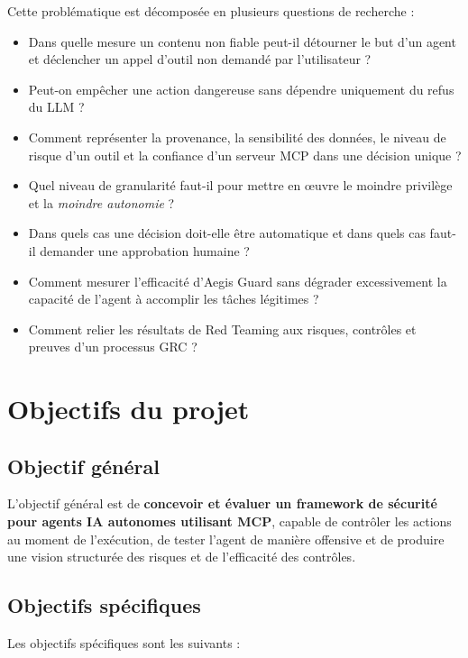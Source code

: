 Cette problématique est décomposée en plusieurs questions de recherche :

\begin{itemize}
    \item Dans quelle mesure un contenu non fiable peut-il détourner le but d'un agent et déclencher un appel d'outil non demandé par l'utilisateur ?
    \item Peut-on empêcher une action dangereuse sans dépendre uniquement du refus du LLM ?
    \item Comment représenter la provenance, la sensibilité des données, le niveau de risque d'un outil et la confiance d'un serveur MCP dans une décision unique ?
    \item Quel niveau de granularité faut-il pour mettre en œuvre le moindre privilège et la \emph{moindre autonomie} ?
    \item Dans quels cas une décision doit-elle être automatique et dans quels cas faut-il demander une approbation humaine ?
    \item Comment mesurer l'efficacité d'Aegis Guard sans dégrader excessivement la capacité de l'agent à accomplir les tâches légitimes ?
    \item Comment relier les résultats de Red Teaming aux risques, contrôles et preuves d'un processus GRC ?
\end{itemize}

\section{Objectifs du projet}

\subsection{Objectif général}

L'objectif général est de \textbf{concevoir et évaluer un framework de sécurité pour agents IA autonomes utilisant MCP}, capable de contrôler les actions au moment de l'exécution, de tester l'agent de manière offensive et de produire une vision structurée des risques et de l'efficacité des contrôles.

\subsection{Objectifs spécifiques}

Les objectifs spécifiques sont les suivants :

